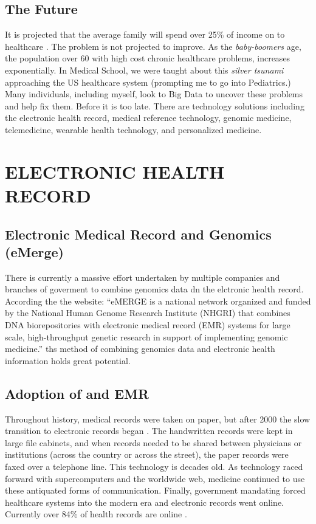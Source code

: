 \documentclass[sigconf]{acmart}
\begin{document}
\subsection{The Future}

It is projected that the average family will spend over 25\% of income
on to healthcare \cite{fox6}.  The problem is not projected to improve.  As
the {\em baby-boomers} age, the population over 60 with high cost chronic
healthcare problems, increases exponentially.  In Medical School, we
were taught about this {\em silver tsunami} approaching the US healthcare
system (prompting me to go into Pediatrics.)  Many individuals,
including myself, look to Big Data to uncover these problems and help
fix them. Before it is too late.  There are technology solutions
including the electronic health record, medical reference technology,
genomic medicine, telemedicine, wearable health technology, and
personalized medicine.


\section{ELECTRONIC HEALTH RECORD}
\subsection{Electronic Medical Record and Genomics (eMerge)}
There is currently a massive effort undertaken by multiple companies and branches of goverment to combine genomics data dn the elctronic health record.  According the the website:  ``eMERGE is a national network organized and funded by the National Human Genome Research Institute (NHGRI) that combines DNA biorepositories with electronic medical record (EMR) systems for large scale, high-throughput genetic research in support of implementing genomic medicine.''  ths method of combining genomics data and electronic health information holds great potential.  

\subsection{Adoption of and EMR}

Throughout history, medical records were taken on paper, but after
2000 the slow transition to electronic records began
\cite{kokkonen2013use}. The handwritten records were kept in large
file cabinets, and when records needed to be shared between physicians
or institutions (across the country or across the street), the paper
records were faxed over a telephone line.  This technology is decades
old.  As technology raced forward with supercomputers and the
worldwide web, medicine continued to use these antiquated forms of
communication.  Finally, government mandating forced healthcare
systems into the modern era and electronic records went online.
Currently over 84\% of health records are online \cite{fox6}.
\end{document}

